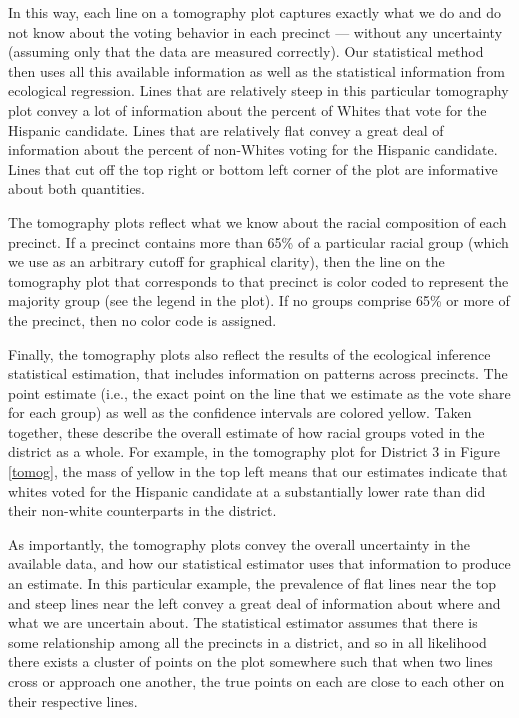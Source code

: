 \documentclass[12pt]{scrartcl}
\begin{document}
In this way, each line on a tomography plot captures exactly what we
do and do not know about the voting behavior in each precinct ---
without any uncertainty (assuming only that the data are measured
correctly). Our statistical method then uses all this available
information as well as the statistical information from ecological
regression. Lines that are relatively steep in this particular
tomography plot convey a lot of information about the percent of
Whites that vote for the Hispanic candidate.  Lines that are
relatively flat convey a great deal of information about the percent
of non-Whites voting for the Hispanic candidate.  Lines that cut off
the top right or bottom left corner of the plot are informative about
both quantities.

The tomography plots reflect what we know about the racial composition
of each precinct. If a precinct contains more than 65\% of a
particular racial group (which we use as an arbitrary cutoff for
graphical clarity), then the line on the tomography plot that
corresponds to that precinct is color coded to represent the majority
group (see the legend in the plot). If no groups comprise 65\% or more
of the precinct, then no color code is assigned.  

Finally, the tomography plots also reflect the results of the
ecological inference statistical estimation, that includes information
on patterns across precincts. The point estimate (i.e., the exact
point on the line that we estimate as the vote share for each group)
as well as the confidence intervals are colored yellow.  Taken
together, these describe the overall estimate of how racial groups
voted in the district as a whole. For example, in the tomography plot
for District 3 in Figure \ref{tomog}, the mass of yellow in the top
left means that our estimates indicate that whites voted for the
Hispanic candidate at a substantially lower rate than did their
non-white counterparts in the district.  

As importantly, the tomography plots convey the overall uncertainty in
the available data, and how our statistical estimator uses that
information to produce an estimate.  In this particular example, the
prevalence of flat lines near the top and steep lines near the left
convey a great deal of information about where and what we are
uncertain about.   The statistical estimator assumes  that there is
some relationship among all the precincts in a district, and so in all
likelihood there exists a cluster of points on the plot somewhere such
that when two lines cross or approach one another, the true points on
each are close to each other on their respective lines.
\end{document}
